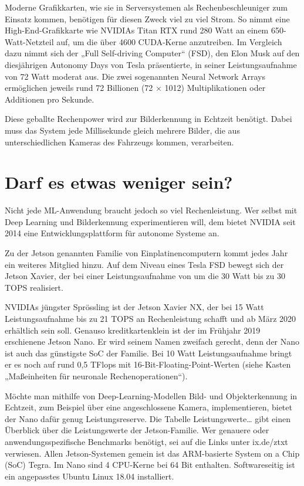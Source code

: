 Moderne Grafikkarten, wie sie in Serversystemen als Rechenbeschleuniger zum Einsatz kommen, benötigen für ­diesen Zweck viel zu viel Strom. So nimmt eine High-End-Grafikkarte wie NVIDIAs Titan RTX rund 280 Watt an einem 650-Watt-Netzteil auf, um die über 4600 CUDA-­Kerne anzutreiben. Im Vergleich dazu nimmt sich der „Full Self-driving Computer“ (FSD), den Elon Musk auf den diesjährigen Autonomy Days von Tesla präsentierte, in seiner Leistungsaufnahme von 72 Watt moderat aus. Die zwei sogenannten Neural Network Arrays ermöglichen jeweils rund 72 Billionen (72 × 1012) Multiplikationen oder Additionen pro Sekunde. 

Diese geballte Rechenpower wird zur Bilderkennung in Echtzeit benötigt. Dabei muss das System jede Millisekunde gleich mehrere Bilder, die aus unterschiedlichen Kameras des Fahrzeugs kommen, verarbeiten. 

\section{Darf es etwas weniger sein?}

Nicht jede ML-Anwendung braucht jedoch so viel Rechenleistung. Wer selbst mit Deep Learning und Bilderkennung experimentieren will, dem bietet NVIDIA seit 2014 eine Entwicklungsplattform für autonome Systeme an. 

Zu der Jetson genannten Familie von Einplatinencomputern kommt jedes Jahr ein weiteres Mitglied hinzu. Auf dem Niveau eines Tesla FSD bewegt sich der Jetson Xavier, der bei einer Leistungsaufnahme von um die 30 Watt bis zu 30 TOPS realisiert. 

NVIDIAs jüngster Sprössling ist der Jetson Xavier NX, der bei 15 Watt Leistungsaufnahme bis zu 21 TOPS an Rechen­leistung schafft und ab März 2020 erhältlich sein soll. Genauso kredit­kartenklein ist der im Frühjahr 2019 erschienene Jetson Nano. Er wird seinem Namen zweifach gerecht, denn der Nano ist auch das günstigste SoC der Familie. Bei 10 Watt Leistungsaufnahme bringt er es noch auf rund 0,5 TFlops mit 16-Bit-Floating-­Point-­Werten (siehe Kasten „Maßeinheiten für neuronale Rechenoperationen“). 


Möchte man mithilfe von Deep-Learning-Modellen Bild- und Objekterkennung in Echtzeit, zum Beispiel über eine angeschlossene Kamera, implementieren, bietet der Nano dafür genug Leistungs­reserve. Die Tabelle \glqq Leistungswerte\ldots\grqq{} gibt einen Überblick über die Leistungswerte der Jetson-Familie. Wer genauere oder anwendungsspezifische Benchmarks benötigt, sei auf die Links unter ix.de/ztxt verwiesen. Allen Jetson-Systemen gemein ist das ARM-basierte System on a Chip (SoC) Tegra. Im Nano sind 4 CPU-Kerne bei 64 Bit enthalten. Softwareseitig ist ein angepasstes Ubuntu Linux 18.04 ­installiert. 

